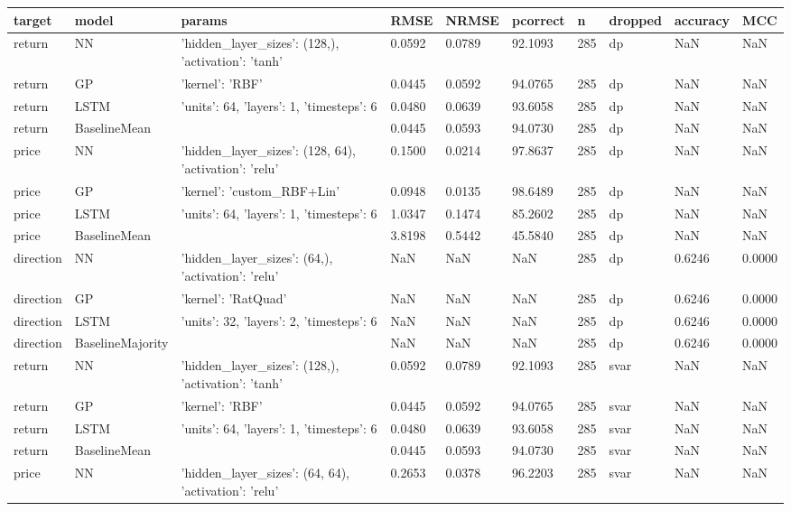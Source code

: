 \begin{table}[H]
\centering
\small
\begin{tabular}{llllllllll}
\toprule
target & model & params & RMSE & NRMSE & pcorrect & n & dropped & accuracy & MCC \\
\midrule
return & NN & {'hidden_layer_sizes': (128,), 'activation': 'tanh'} & 0.0592 & 0.0789 & 92.1093 & 285 & dp & NaN & NaN \\
return & GP & {'kernel': 'RBF'} & 0.0445 & 0.0592 & 94.0765 & 285 & dp & NaN & NaN \\
return & LSTM & {'units': 64, 'layers': 1, 'timesteps': 6} & 0.0480 & 0.0639 & 93.6058 & 285 & dp & NaN & NaN \\
return & BaselineMean & {} & 0.0445 & 0.0593 & 94.0730 & 285 & dp & NaN & NaN \\
price & NN & {'hidden_layer_sizes': (128, 64), 'activation': 'relu'} & 0.1500 & 0.0214 & 97.8637 & 285 & dp & NaN & NaN \\
price & GP & {'kernel': 'custom_RBF+Lin'} & 0.0948 & 0.0135 & 98.6489 & 285 & dp & NaN & NaN \\
price & LSTM & {'units': 64, 'layers': 1, 'timesteps': 6} & 1.0347 & 0.1474 & 85.2602 & 285 & dp & NaN & NaN \\
price & BaselineMean & {} & 3.8198 & 0.5442 & 45.5840 & 285 & dp & NaN & NaN \\
direction & NN & {'hidden_layer_sizes': (64,), 'activation': 'relu'} & NaN & NaN & NaN & 285 & dp & 0.6246 & 0.0000 \\
direction & GP & {'kernel': 'RatQuad'} & NaN & NaN & NaN & 285 & dp & 0.6246 & 0.0000 \\
direction & LSTM & {'units': 32, 'layers': 2, 'timesteps': 6} & NaN & NaN & NaN & 285 & dp & 0.6246 & 0.0000 \\
direction & BaselineMajority & {} & NaN & NaN & NaN & 285 & dp & 0.6246 & 0.0000 \\
return & NN & {'hidden_layer_sizes': (128,), 'activation': 'tanh'} & 0.0592 & 0.0789 & 92.1093 & 285 & svar & NaN & NaN \\
return & GP & {'kernel': 'RBF'} & 0.0445 & 0.0592 & 94.0765 & 285 & svar & NaN & NaN \\
return & LSTM & {'units': 64, 'layers': 1, 'timesteps': 6} & 0.0480 & 0.0639 & 93.6058 & 285 & svar & NaN & NaN \\
return & BaselineMean & {} & 0.0445 & 0.0593 & 94.0730 & 285 & svar & NaN & NaN \\
price & NN & {'hidden_layer_sizes': (64, 64), 'activation': 'relu'} & 0.2653 & 0.0378 & 96.2203 & 285 & svar & NaN & NaN \\

\end{tabular}
\end{table}
